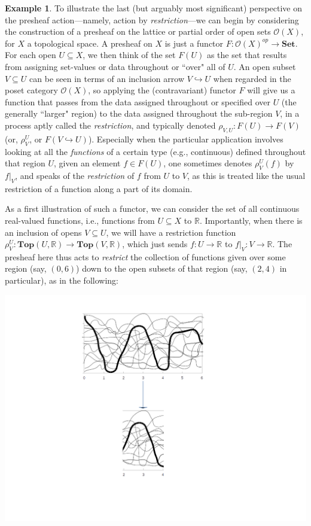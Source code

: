 \documentclass[11pt]{book}
\theoremstyle{definition}
\newtheorem{example}{Example}[section]
\theoremstyle{definition}
\theoremstyle{definition}
\theoremstyle{theorem}
\theoremstyle{definition}
\begin{document}
	\begin{example}
		To illustrate the last (but arguably most significant) perspective on the presheaf action---namely, action by \textit{restriction}---we can begin by considering the construction of a presheaf on the lattice or partial order of open sets $\mathscr{O}(X)$, for $X$ a topological space. A presheaf on $X$ is just a functor $F: \mathscr{O}(X)^{op} \rightarrow \textbf{Set}$. For each open $U \subseteq  X$, we then think of the set $F(U)$ as the set that results from assigning set-values or data throughout or ``over" all of $U$. An open subset $V \subseteq  U$ can be seen in terms of an inclusion arrow $V \hookrightarrow U$ when regarded in the poset category $\mathscr{O}(X)$, so applying the (contravariant) functor $F$ will give us a function that passes from the data assigned throughout or specified over $U$ (the generally ``larger" region) to the data assigned throughout the sub-region $V$, in a process aptly called the \textit{restriction}, and typically denoted $\rho_{V,U}: F(U) \rightarrow F(V)$ (or, $\rho^U_V$, or $F(V \hookrightarrow U)$). Especially when the particular application involves looking at all the \textit{functions} of a certain type (e.g., continuous) defined throughout that region $U$, given an element $f \in F(U)$, one sometimes denotes $\rho^{U}_V(f)$ by $f|_V$, and speaks of the \textit{restriction} of $f$ from $U$ to $V$, as this is treated like the usual restriction of a function along a part of its domain. \par 
		As a first illustration of such a functor, we can consider the set of all continuous real-valued functions, i.e., functions from $U \subseteq  X$ to $\mathbb{R}$. Importantly, when there is an inclusion of opens $V \subseteq  U$, we will have a restriction function $\rho^U_V: \textbf{Top}(U, \mathbb{R}) \rightarrow \textbf{Top}(V, \mathbb{R})$, which just sends $f: U \rightarrow \mathbb{R}$ to $f|_V: V \rightarrow \mathbb{R}$. The presheaf here thus acts to \textit{restrict} the collection of functions given over some region (say, $(0,6)$) down to the open subsets of that region (say, $(2,4)$ in particular), as in the following:
		\begin{center}
			\includegraphics[scale=0.5]{RealAlgebraSheaf.png}

\end{center}
\end{example}
\end{document}
